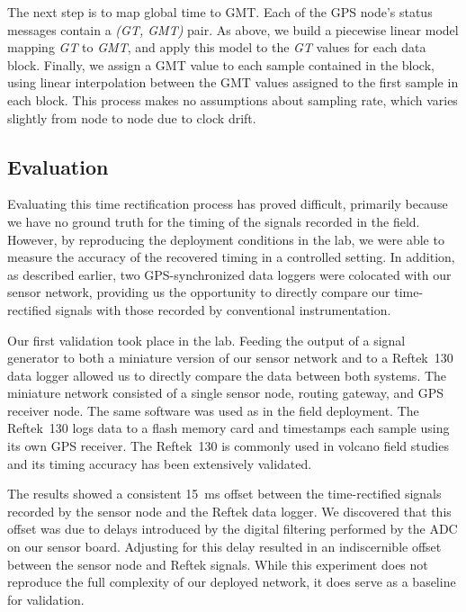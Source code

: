 The next step is to map global time to GMT. Each of the GPS node's status
messages contain a \textit{(GT, GMT)} pair. As above, we build a piecewise
linear model mapping \textit{GT} to \textit{GMT}, and apply this model to the
\textit{GT} values for each data block. Finally, we assign a GMT value to
each sample contained in the block, using linear interpolation between the
GMT values assigned to the first sample in each block. This process makes no
assumptions about sampling rate, which varies slightly from node to node due
to clock drift.

\subsection{Evaluation}
\label{evaluation-timing-postdeployment}

Evaluating this time rectification process has proved difficult, primarily
because we have no ground truth for the timing of the signals recorded in the
field. However, by reproducing the deployment conditions in the lab, we were
able to measure the accuracy of the recovered timing in a controlled setting.
In addition, as described earlier, two GPS-synchronized data loggers were
colocated with our sensor network, providing us the opportunity to directly
compare our time-rectified signals with those recorded by conventional
instrumentation.

Our first validation took place in the lab. Feeding the output of a signal
generator to both a miniature version of our sensor network and to a
Reftek~130 data logger allowed us to directly compare the data between both
systems. The miniature network consisted of a single sensor node, routing
gateway, and GPS receiver node. The same software was used as in the field
deployment. The Reftek~130 logs data to a flash memory card and timestamps
each sample using its own GPS receiver. The Reftek~130 is commonly used in
volcano field studies and its timing accuracy has been extensively validated.

The results showed a consistent 15~ms offset between the time-rectified
signals recorded by the sensor node and the Reftek data logger. We discovered
that this offset was due to delays introduced by the digital filtering
performed by the ADC on our sensor board. Adjusting for this delay resulted
in an indiscernible offset between the sensor node and Reftek signals. While
this experiment does not reproduce the full complexity of our deployed
network, it does serve as a baseline for validation.

